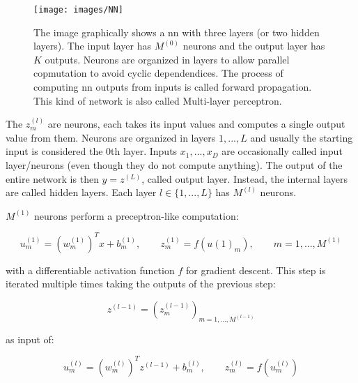 \begin{figure}[H]
	\centering
	\texttt{[image: images/NN]}
	\caption[Feed forward neural network.]{The image graphically shows a \gls{nn} with three layers (or two hidden layers). The input layer has $M^{(0)}$ neurons and the output layer has $K$ outputs. Neurons are organized in  layers to allow parallel copmutation to avoid cyclic dependendices. The process of computing \gls{nn} outputs from inputs is called forward propagation. This kind of network is also called Multi-layer perceptron.}
	\label{fig:nn}
\end{figure}

\noindent The $z^{(l)}_m$ are neurons, each takes its input values and computes a single output value from them. Neurons are organized in layers $1,...,L$ and usually the starting input is considered the 0th layer. Inputs $x_1,...,x_D$ are occasionally called input layer/neurons (even though they do not compute anything). The output of the entire network is then $y=z^{(L)}$, called output layer. Instead, the internal layers are called hidden layers. Each layer $l\in \{1,...,L\}$ has $M^{(l)}$ neurons.

\noindent $M^{(1)}$ neurons perform a preceptron-like computation:

\begin{Equation}[H]
	\centering
	\begin{equation}
	u^{(1)}_m = (w^{(1)}_m)^T x + b^{(1)}_m,  
	\quad \quad
	z^{(1)}_m = f(u{(1)}_m),
	\quad \quad
	m=1,...,M^{(1)}
	\end{equation}
	\label{eq:hommatrix}
\end{Equation}

\noindent with a differentiable activation function $f$ for gradient descent. This step is iterated multiple times taking the outputs of the previous step:

\begin{Equation}[H]
	\centering
	\begin{equation}
	z^{(l-1)} = (z^{(l-1)}_m)_{m=1,...,M^{(l-1)}}
	\end{equation}
	\label{eq:hommatrix}
\end{Equation}

\noindent as input of:

\begin{Equation}[H]
	\centering
	\begin{equation}
		u^{(l)}_m = (w^{(l)}_m)^T z^{(l-1)} + b^{(l)}_m,  
		\quad \quad
		z^{(l)}_m = f(u^{(l)}_m)
	\end{equation}
	\label{eq:hommatrix}
\end{Equation}

